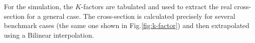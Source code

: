 For the simulation, the $K$-factors are tabulated and used to extract the real cross-section for a general case. The cross-section is calculated precisely for several benchmark cases (the same one shown in Fig.\ref{fig:k-factor}) and then extrapolated using a Bilinear interpolation.










